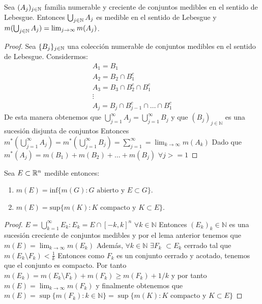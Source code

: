\begin{lema}
    Sea $(A_j)_{j \in \mathbb{N}}$ familia numerable y creciente de conjuntos medibles en el sentido de Lebesgue. Entonces $\bigcup_{j \in \mathbb{N}} A_j$ es medible en el sentido de Lebesgue y $m(\bigcup_{j \in \mathbb{N}} A_j) = \lim_{j \to \infty} m(A_j)$.
\end{lema}

\begin{proof}
    Sea $\{B_j\}_{j \in \mathbb{N}}$ una colección numerable de conjuntos medibles en el sentido de Lebesgue. Considermos:
    \[\begin{matrix}
            A_1 = B_1                       \\
            A_2 = B_2 \cap B_1^c            \\
            A_3 = B_3 \cap B_2^c \cap B_1^c \\
            \vdots                          \\
            A_j = B_j \cap B_{j-1}^c \cap \ldots \cap B_1^c
        \end{matrix}\]
    De esta manera obtenemos que $\bigcup_{j = 1}^{\infty} A_j = \bigcup_{j =
            1}^{\infty} B_j$ y que $(B_j)_{j \in \mathbb{N}}$ es una sucesión disjunta de
    conjuntos Entonces $m^*(\bigcup_{j = 1}^{\infty}A_j) = m^*(\bigcup_{j =
            1}^{\infty}B_j) = \sum_{j = 1}^{\infty} = \lim_{k \to \infty} m(A_k)$ Dado que
    $m^*(A_j) = m(B_1) + m(B_2) + \ldots + m(B_j)$ $ \forall j >= 1$
\end{proof}

\begin{corolario}
    Sea $E \subset \mathbb{R}^n$ medible entonces:
    \begin{enumerate}
        \item $m(E) = \text{inf}\{m(G) : G \text{ abierto y } E \subset G\}$.
        \item $m(E) = \text{sup}\{m(K) : K \text{ compacto y } K \subset E\}$.
    \end{enumerate}
\end{corolario}

\begin{proof}
    $E = \bigcup_{k = 1}^{\infty} E_k : E_k = E \cap [-k, k]^n$ $\forall k \in \mathbb{N}$
    Entonces $(E_k)_k \in \mathbb{N}$ es una sucesión creciente de conjuntos medibles y por el lema anterior tenemos que $m(E) = \lim_{k \to \infty} m(E_k)$
    Además, $\forall k \in \mathbb{N}$ $\exists F_k$ $ \subset E_k$ cerrado tal que $m(E_k \setminus F_k) < \frac{1}{k}$
    Entonces como $F_k$ es un conjunto cerrado y acotado, tenemos que el conjunto es compacto.
    Por tanto $m(E_k) = m(E_k \setminus F_k) + m(F_k) \geq m(F_k) + 1/k$ y por tanto $m(E) = \lim_{k \to \infty} m(F_k)$ y finalmente obtenemos que
    $m(E) = \sup\{m(F_k) : k \in \mathbb{N} \} = \sup\{m(K) : K \text{ compacto y } K \subset E\}$
\end{proof}

